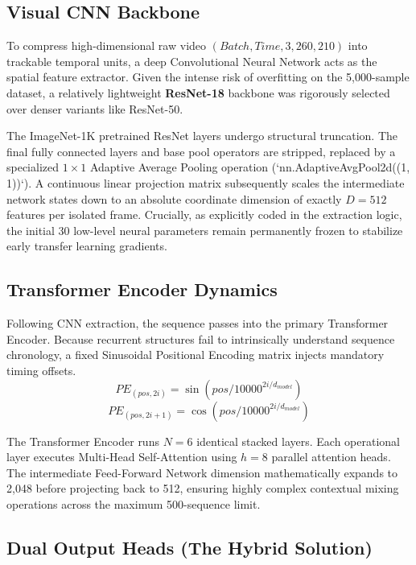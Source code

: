 \subsection{Visual CNN Backbone}

To compress high-dimensional raw video $(Batch, Time, 3, 260, 210)$ into trackable temporal units, a deep Convolutional Neural Network acts as the spatial feature extractor. Given the intense risk of overfitting on the 5,000-sample dataset, a relatively lightweight \textbf{ResNet-18} backbone was rigorously selected over denser variants like ResNet-50.

The ImageNet-1K pretrained ResNet layers undergo structural truncation. The final fully connected layers and base pool operators are stripped, replaced by a specialized $1 \times 1$ Adaptive Average Pooling operation (`nn.AdaptiveAvgPool2d((1, 1))`). A continuous linear projection matrix subsequently scales the intermediate network states down to an absolute coordinate dimension of exactly $D = 512$ features per isolated frame. Crucially, as explicitly coded in the extraction logic, the initial 30 low-level neural parameters remain permanently frozen to stabilize early transfer learning gradients.

\subsection{Transformer Encoder Dynamics}

Following CNN extraction, the sequence passes into the primary Transformer Encoder. Because recurrent structures fail to intrinsically understand sequence chronology, a fixed Sinusoidal Positional Encoding matrix injects mandatory timing offsets. 
\begin{equation}
PE_{(pos, 2i)} = \sin(pos / 10000^{2i/d_{model}})
\end{equation}
\begin{equation}
PE_{(pos, 2i+1)} = \cos(pos / 10000^{2i/d_{model}})
\end{equation}

The Transformer Encoder runs $N=6$ identical stacked layers. Each operational layer executes Multi-Head Self-Attention using $h=8$ parallel attention heads. The intermediate Feed-Forward Network dimension mathematically expands to 2,048 before projecting back to 512, ensuring highly complex contextual mixing operations across the maximum 500-sequence limit. 

\subsection{Dual Output Heads (The Hybrid Solution)}

